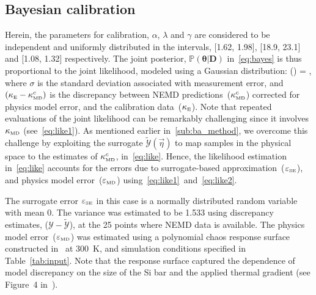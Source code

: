 \subsection{Bayesian calibration}
\label{sub:ba}

Herein, the parameters for calibration, $\alpha$, $\lambda$ and $\gamma$ are considered to be independent and
uniformly distributed in the intervals, [1.62, 1.98], [18.9, 23.1] and [1.08, 1.32] respectively.
The joint posterior, $\mathbb{P}(\bm{\theta}\vert \bm{D})$ in~\eqref{eq:bayes} is thus 
proportional to the joint likelihood, modeled using a Gaussian distribution:
%
\be
{}(\vert\bm{\theta}) = \exp{},
\label{eq:like}
\ee
%
\noindent where $\sigma$ is the standard deviation associated with measurement error, and
$(\kappa_{\tiny{\mbox{E}}} - \kappa_{\tiny{\mbox{MD}}}^c)$ is the discrepancy between 
NEMD predictions~($\kappa_{\tiny{\mbox{MD}}}^c$) corrected for physics model error, 
and the calibration data~($\kappa_{\tiny{\mbox{E}}}$). 
Note that repeated evaluations of the joint likelihood can be remarkably challenging since it involves 
$\kappa_{\tiny{\mbox{MD}}}$ (see~\eqref{eq:like1}). 
As mentioned earlier in~\ref{sub:ba_method}, we overcome this challenge by
exploiting the surrogate
$\tilde{\mathcal{Y}}(\vec{\eta})$ to map samples in the physical space to the estimates of 
$\kappa_{\tiny{\mbox{MD}}}^c$, in~\eqref{eq:like}. Hence, the likelihood estimation in~\eqref{eq:like}
accounts for the errors due to surrogate-based approximation~($\varepsilon_\text{\tiny{SE}}$), and
physics model error~($\varepsilon_\text{\tiny{MD}}$) using~\eqref{eq:like1}~and~\eqref{eq:like2}.

The surrogate error $\varepsilon_\text{\tiny{SE}}$ in this case is a normally distributed random
variable with mean 0. The variance was estimated to be 1.533 using discrepancy estimates, 
($\mathcal{Y}-\tilde{\mathcal{Y}}$), at the 25 points where NEMD data is available.  
The physics model error~($\varepsilon_\text{\tiny{MD}}$) was estimated using a polynomial chaos
response surface constructed in~\cite{Vohra:2018a} at 
300~K, and simulation conditions specified in Table~\ref{tab:input}. Note that the response surface
captured the dependence of model discrepancy on the size of the Si bar and the applied thermal gradient
(see Figure~4 in~\cite{Vohra:2018a}).

